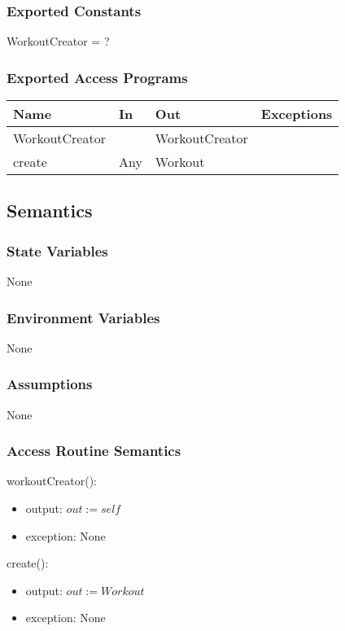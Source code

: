 \documentclass[12pt, titlepage]{article}
\begin{document}
\subsubsection{Exported Constants}

WorkoutCreator = ?

\subsubsection{Exported Access Programs}

\begin{center}
	\begin{tabular}{p{2cm} p{4cm} p{4cm} p{2cm}}
		\hline
		\textbf{Name} & \textbf{In} & \textbf{Out} & \textbf{Exceptions} \\
		\hline
		WorkoutCreator &  & WorkoutCreator &  \\
		create & Any & Workout &  \\
		\hline
	\end{tabular}
\end{center}

\subsection{Semantics}

\subsubsection{State Variables}
None
\subsubsection{Environment Variables}
None

\subsubsection{Assumptions}
None
\subsubsection{Access Routine Semantics}

\noindent workoutCreator():
\begin{itemize}
	\item output: $out := self$
	\item exception: None
\end{itemize}

\noindent create():
\begin{itemize}
	\item output: $out := Workout$
	\item exception: None
\end{itemize}
\end{document}
